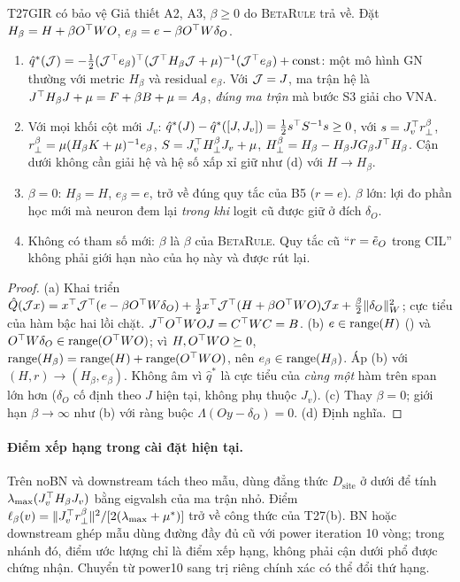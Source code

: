 \begin{namedthm}{T27}{GIR có bảo vệ}
Giả thiết A2, A3, $\beta\ge0$ do \textsc{BetaRule} trả về. Đặt $H_\beta=H+\beta O^{\top} WO$, $e_\beta=e-\beta O^{\top} W\delta_O$.
\begin{enumerate}[label=(\alph*)]
\item $\hat q^*(\mathcal{J})=-\tfrac12(\mathcal{J}^{\top} e_\beta)^{\top}(\mathcal{J}^{\top} H_\beta\mathcal{J}+\mu)^{-1}(\mathcal{J}^{\top} e_\beta)+\mathrm{const}$: một mô hình GN thường với metric $H_\beta$ và residual $e_\beta$. Với $\mathcal{J}=J$, ma trận hệ là $J^{\top} H_\beta J+\mu=F+\beta B+\mu=A_\beta$, \emph{đúng ma trận} mà bước S3 giải cho VNA.
\item Với mọi khối cột mới $J_v$: $\hat q^*(J)-\hat q^*([J,J_v])=\tfrac12s^{\top} S^{-1}s\ge0$, với $s=J_v^{\top}r_{\perp}^\beta$, $r_{\perp}^\beta=\mu(H_\beta K+\mu)^{-1}e_\beta$, $S=J_v^{\top} H_\perp^\beta J_v+\mu$, $H_\perp^\beta=H_\beta-H_\beta JG_\beta J^{\top} H_\beta$. Cận dưới không cần giải hệ và hệ số xấp xỉ giữ như (d) với $H\to H_\beta$.
\item $\beta=0$: $H_\beta=H$, $e_\beta=e$, trở về đúng quy tắc của B5 ($r=e$). $\beta$ lớn: lợi đo phần học mới mà neuron đem lại \emph{trong khi} logit cũ được giữ ở đích $\delta_O$.
\item Không có tham số mới: $\beta$ là $\beta$ của \textsc{BetaRule}. Quy tắc cũ ``$r=\tilde e_O$ trong CIL'' không phải giới hạn nào của họ này và được rút lại.
\end{enumerate}
\end{namedthm}
\begin{proof}
(a) Khai triển $\hat Q(\mathcal{J} x)=x^{\top}\mathcal{J}^{\top}(e-\beta O^{\top} W\delta_O)+\tfrac12x^{\top}\mathcal{J}^{\top}(H+\beta O^{\top} WO)\mathcal{J} x+\tfrac\beta2\lVert \delta_O\rVert_W^2$; cực tiểu của hàm bậc hai lồi chặt. $J^{\top} O^{\top} WOJ=C^{\top} WC=B$.
(b) $e\in\operatorname{range}(H)$ () và $O^{\top} W\delta_O\in\operatorname{range}(O^{\top} WO)$; vì $H,O^{\top} WO\succeq0$, $\operatorname{range}(H_\beta)=\operatorname{range}(H)+\operatorname{range}(O^{\top} WO)$, nên $e_\beta\in\operatorname{range}(H_\beta)$. Áp (b) với $(H,r)\to(H_\beta,e_\beta)$. Không âm vì $\hat q^*$ là cực tiểu của \emph{cùng một} hàm trên span lớn hơn ($\delta_O$ cố định theo $J$ hiện tại, không phụ thuộc $J_v$).
(c) Thay $\beta=0$; giới hạn $\beta\to\infty$ như (b) với ràng buộc $\Lambda(Oy-\delta_O)=0$.
(d) Định nghĩa.
\end{proof}

\paragraph{Điểm xếp hạng trong cài đặt hiện tại.}
Trên noBN và downstream tách theo mẫu, dùng đẳng thức $D_{\mathrm{site}}$
ở dưới để tính $\lambda_{\max}(J_v^{\top} H_\beta J_v)$ bằng eigvalsh của ma trận
nhỏ. Điểm $\ell_\beta(v)=\lVert J_v^{\top}r_{\perp}^\beta\rVert^2/
[2(\lambda_{\max}+\mu^*)]$ trở về công thức của T27(b).
BN hoặc downstream ghép mẫu dùng đường đầy đủ cũ với power iteration 10 vòng;
trong nhánh đó, điểm ước lượng chỉ là điểm xếp hạng, không phải cận dưới phổ
được chứng nhận. Chuyển từ power10 sang trị riêng chính xác có thể đổi thứ hạng.


